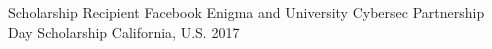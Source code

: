 




\begin{cvhonors}

  \cvhonor
    {Scholarship Recipient} %
    {Facebook Enigma and University Cybersec Partnership Day Scholarship} %
    {California, U.S.} %
    {2017} %


\end{cvhonors}
